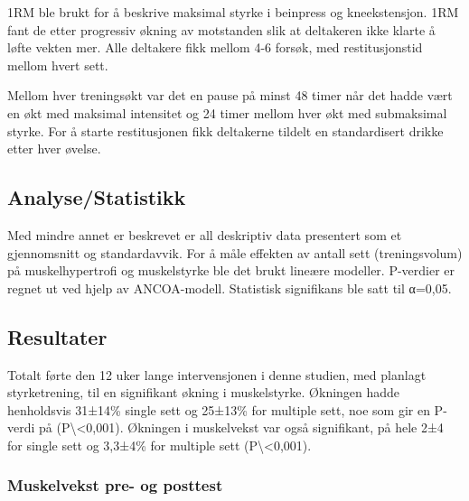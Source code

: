\documentclass[
  letterpaper,
  DIV=11,
  numbers=noendperiod]{scrartcl}
\begin{document}
1RM ble brukt for å beskrive maksimal styrke i beinpress og
kneekstensjon. 1RM fant de etter progressiv økning av motstanden slik at
deltakeren ikke klarte å løfte vekten mer. Alle deltakere fikk mellom
4-6 forsøk, med restitusjonstid mellom hvert sett. ~

Mellom hver treningsøkt var det en pause på minst 48 timer når det hadde
vært en økt med maksimal intensitet og 24 timer mellom hver økt med
submaksimal styrke. For å starte restitusjonen fikk deltakerne tildelt
en standardisert drikke etter hver øvelse.

\hypertarget{analysestatistikk}{%
\subsection{Analyse/Statistikk}\label{analysestatistikk}}

Med mindre annet er beskrevet er all deskriptiv data presentert som et
gjennomsnitt og standardavvik. For å måle effekten av antall sett
(treningsvolum) på muskelhypertrofi og muskelstyrke ble det brukt
lineære modeller. P-verdier er regnet ut ved hjelp av ANCOA-modell.
Statistisk signifikans ble satt til α=0,05.

\hypertarget{resultater}{%
\subsection{Resultater}\label{resultater}}

Totalt førte den 12 uker lange intervensjonen i denne studien, med
planlagt styrketrening, til en signifikant økning i muskelstyrke.
Økningen hadde henholdsvis 31±14\% single sett og 25±13\% for multiple
sett, noe som gir en P-verdi på (P\textbackslash\textless0,001).
Økningen i muskelvekst var også signifikant, på hele 2±4 for single sett
og 3,3±4\% for multiple sett (P\textbackslash\textless0,001).

\hypertarget{muskelvekst-pre--og-posttest}{%
\subsubsection{Muskelvekst pre- og
posttest}\label{muskelvekst-pre--og-posttest}}
\end{document}

